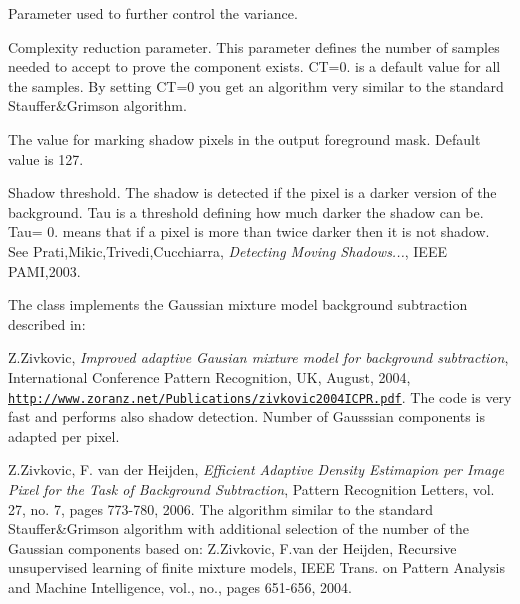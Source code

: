 {\ttfamily }

{\ttfamily }

{\ttfamily Parameter used to further control the variance.}

{\ttfamily }

{\ttfamily }

{\ttfamily Complexity reduction parameter. This parameter defines the number of samples needed to accept to prove the component exists. {\ttfamily CT=0.} is a default value for all the samples. By setting {\ttfamily CT=0} you get an algorithm very similar to the standard Stauffer\&Grimson algorithm.}

{\ttfamily }

{\ttfamily }

{\ttfamily The value for marking shadow pixels in the output foreground mask. Default value is 127.}

{\ttfamily }

{\ttfamily }

{\ttfamily Shadow threshold. The shadow is detected if the pixel is a darker version of the background. {\ttfamily Tau} is a threshold defining how much darker the shadow can be. {\ttfamily Tau= 0.} means that if a pixel is more than twice darker then it is not shadow. See Prati,Mikic,Trivedi,Cucchiarra, {\itshape Detecting Moving Shadows...}, I\+E\+EE P\+A\+MI,2003.}

{\ttfamily }

{\ttfamily }

{\ttfamily The class implements the Gaussian mixture model background subtraction described in\+: }


\begin{DoxyItemize}
\item Z.\+Zivkovic, {\itshape Improved adaptive Gausian mixture model for background subtraction}, International Conference Pattern Recognition, UK, August, 2004, \href{http://www.zoranz.net/Publications/zivkovic2004ICPR.pdf}{\tt http\+://www.\+zoranz.\+net/\+Publications/zivkovic2004\+I\+C\+P\+R.\+pdf}. The code is very fast and performs also shadow detection. Number of Gausssian components is adapted per pixel. 
\item Z.\+Zivkovic, F. van der Heijden, {\itshape Efficient Adaptive Density Estimapion per Image Pixel for the Task of Background Subtraction}, Pattern Recognition Letters, vol. 27, no. 7, pages 773-\/780, 2006. The algorithm similar to the standard Stauffer\&Grimson algorithm with additional selection of the number of the Gaussian components based on\+: Z.\+Zivkovic, F.\+van der Heijden, Recursive unsupervised learning of finite mixture models, I\+E\+EE Trans. on Pattern Analysis and Machine Intelligence, vol., no., pages 651-\/656, 2004. 
\end{DoxyItemize}

